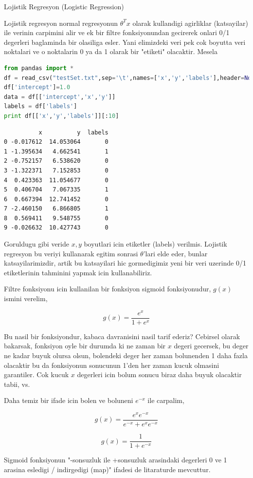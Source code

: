 \documentclass[12pt,fleqn]{article}\usepackage{../common}
\begin{document}
Lojistik Regresyon (Logistic Regression)

Lojistik regresyon normal regresyonun $\theta^T x$ olarak kullandigi agirliklar
(katsayilar) ile verinin carpimini alir ve ek bir filtre fonksiyonundan
gecirerek onlari 0/1 degerleri baglaminda bir olasiliga esler. Yani
elimizdeki veri pek cok boyutta veri noktalari ve o noktalarin 0 ya da 1
olarak bir "etiketi" olacaktir. Mesela

\begin{lstlisting}[language=Python]
from pandas import *
df = read_csv("testSet.txt",sep='\t',names=['x','y','labels'],header=None)
df['intercept']=1.0
data = df[['intercept','x','y']]
labels = df['labels']
print df[['x','y','labels']][:10]
\end{lstlisting}

\begin{verbatim}
          x          y  labels
0 -0.017612  14.053064       0
1 -1.395634   4.662541       1
2 -0.752157   6.538620       0
3 -1.322371   7.152853       0
4  0.423363  11.054677       0
5  0.406704   7.067335       1
6  0.667394  12.741452       0
7 -2.460150   6.866805       1
8  0.569411   9.548755       0
9 -0.026632  10.427743       0
\end{verbatim}


Goruldugu gibi veride $x,y$ boyutlari icin etiketler (labels)
verilmis. Lojistik regresyon bu veriyi kullanarak egitim sonrasi
$\theta$'lari elde eder, bunlar katsayilarimizdir, artik bu
katsayilari hic gormedigimiz yeni bir veri uzerinde 0/1 etiketlerinin
tahminini yapmak icin kullanabiliriz.

Filtre fonksiyonu icin kullanilan bir fonksiyon sigmoid fonksiyonudur,
$g(x)$ ismini verelim,

$$ g(x) = \frac{e^{x}}{1+e^{x}} $$

Bu nasil bir fonksiyondur, kabaca davranisini nasil tarif ederiz?
Cebirsel olarak bakarsak, fonksiyon oyle bir durumda ki ne zaman bir
$x$ degeri gecersek, bu deger ne kadar buyuk olursa olsun, bolendeki
deger her zaman bolunenden 1 daha fazla olacaktir bu da fonksiyonun
sonucunun 1'den her zaman kucuk olmasini garantiler. Cok kucuk $x$
degerleri icin bolum sonucu biraz daha buyuk olacaktir tabii, vs.

Daha temiz bir ifade icin bolen ve boluneni $e^{-x}$ ile carpalim,

$$ g(x) = \frac{e^{x}e^{-x}}{e^{-x}+e^{x}e^{-x}} $$

$$ g(x) = \frac{1}{1+e^{-x}} $$

Sigmoid fonksiyonun "-sonsuzluk ile +sonsuzluk arasindaki degerleri 0
ve 1 arasina esledigi / indirgedigi (map)" ifadesi de litaraturde
mevcuttur.
\end{document}
